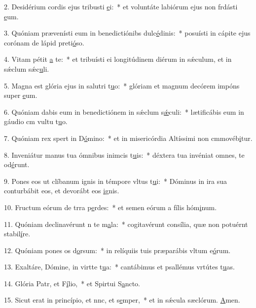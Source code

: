 2. Desidérium cordis ejus tribusti \uline{e}i:~* et voluntáte labiórum ejus non frdásti \uline{e}um.\par 
3. Quóniam prævenísti eum in benedictiónibs dulc\uline{é}dinis:~* posuísti in cápite ejus corónam de lápid preti\uline{ó}so.\par 
4. Vitam pétit \uline{a} te:~* et tribuísti ei longitúdinem diérum in sǽculum, et in sǽclum sǽc\uline{u}li.\par 
5. Magna est glória ejus in salutri t\uline{u}o:~* glóriam et magnum decórem impóns super \uline{e}um.\par 
6. Quóniam dabis eum in benedictiónem in sǽclum s\uline{ǽ}culi:~* lætificábis eum in gáudio cm vultu t\uline{u}o.\par 
7. Quóniam rex spert in D\uline{ó}mino:~* et in misericórdia Altíssimi non cmmovéb\uline{i}tur.\par 
8. Inveniátur manus tua ómnibus inimcis t\uline{u}is:~* déxtera tua invéniat omnes,  te od\uline{é}runt.\par 
9. Pones eos ut clíbanum ignis in témpore vltus t\uline{u}i:~* Dóminus in ira sua conturbábit eos, et devorábt eos \uline{i}gnis.\par 
10. Fructum eórum de trra p\uline{e}rdes:~* et semen eórum a fílis hóm\uline{i}num.\par 
11. Quóniam declinavérunt n te m\uline{a}la:~* cogitavérunt consília, quæ non potuérnt stabil\uline{í}re.\par 
12. Quóniam pones os d\uline{o}rsum:~* in relíquiis tuis præparábis vltum e\uline{ó}rum.\par 
13. Exaltáre, Dómine, in virtte t\uline{u}a:~* cantábimus et psallémus vrtútes t\uline{u}as.\par 
14. Glória Patr, et F\uline{í}lio,~* et Spirtui S\uline{a}ncto.\par 
15. Sicut erat in princípio, et nnc, et s\uline{e}mper,~* et in sǽcula sæclórum. \uline{A}men.\par 
